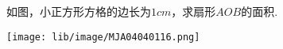 如图，小正方形方格的边长为$1cm$，求扇形$AOB$的面积.

\begin{center}
    \texttt{[image: lib/image/MJA04040116.png]}
\end{center}